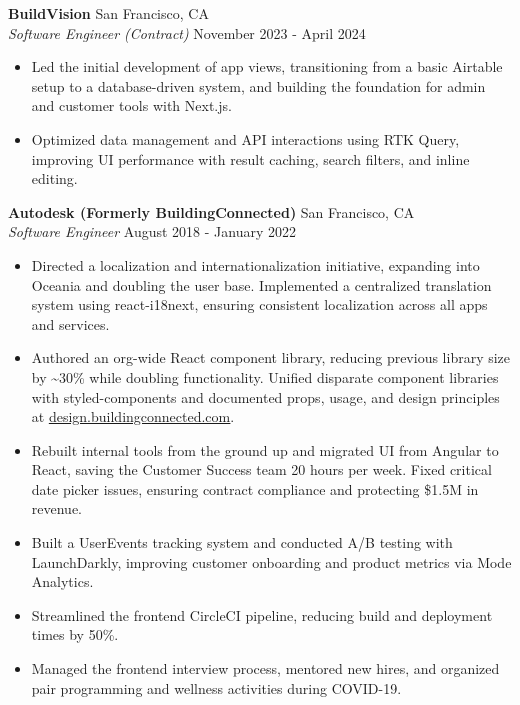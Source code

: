 \documentclass[a4paper]{article}
\begin{document}
\textbf{BuildVision} \hfill San Francisco, CA\\
\textit{Software Engineer (Contract)} \hfill November 2023 - April 2024\\
\vspace{-1mm}
\begin{itemize} \itemsep .5pt
    \item Led the initial development of app views, transitioning from a basic Airtable setup to a database-driven system, and building the foundation for admin and customer tools with Next.js.
    \item Optimized data management and API interactions using RTK Query, improving UI performance with result caching, search filters, and inline editing.
\end{itemize}



\textbf{Autodesk (Formerly BuildingConnected)} \hfill San Francisco, CA\\
\textit{Software Engineer} \hfill August 2018 - January 2022\\
\vspace{-1mm}
\begin{itemize} \itemsep .5pt
    \item Directed a localization and internationalization initiative, expanding into Oceania and doubling the user base. Implemented a centralized translation system using react-i18next, ensuring consistent localization across all apps and services.
    \item Authored an org-wide React component library, reducing previous library size by \textasciitilde{}30\% while doubling functionality. Unified disparate component libraries with styled-components and documented props, usage, and design principles at \href{https://design.buildingconnected.com/}{\underline{design.buildingconnected.com}}.
    \item Rebuilt internal tools from the ground up and migrated UI from Angular to React, saving the Customer Success team 20 hours per week. Fixed critical date picker issues, ensuring contract compliance and protecting \$1.5M in revenue.
    \item Built a UserEvents tracking system and conducted A/B testing with LaunchDarkly, improving customer onboarding and product metrics via Mode Analytics.
    \item Streamlined the frontend CircleCI pipeline, reducing build and deployment times by 50\%.
    \item Managed the frontend interview process, mentored new hires, and organized pair programming and wellness activities during COVID-19.
\end{itemize}
\end{document}
